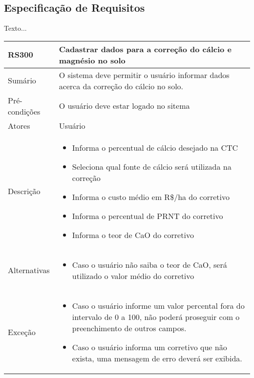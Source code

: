 \subsection{Especificação de Requisitos}
\label{sec:titSecEspReq}

Texto...

\begin{quadro}[H]
    \begin{tabular}{|p{3cm}|p{11cm}|}
        \hline
        \textbf{RS300} & \textbf{Cadastrar dados para a correção do cálcio e magnésio no solo}                  \\
        \hline
        Sumário        & O sistema deve permitir o usuário informar dados acerca da correção do cálcio no solo. \\
        \hline
        Pré-condições  & O usuário deve estar logado no sitema                                                  \\
        \hline
        Atores         & Usuário                                                                                \\
        \hline
        Descrição      &
        \begin{itemize}
            \item Informa o percentual de cálcio desejado na CTC
            \item Seleciona qual fonte de cálcio será utilizada na correção
            \item Informa o custo médio em R\$/ha do corretivo
            \item Informa o percentual de PRNT do corretivo
            \item Informa o teor de CaO do corretivo
        \end{itemize}                                                                               \\
        \hline
        Alternativas   &
        \begin{itemize}
            \item Caso o usuário não saiba o teor de CaO, será utilizado o valor médio do corretivo
        \end{itemize}                                                                               \\
        \hline
        Exceção        &
        \begin{itemize}
            \item Caso o usuário informe um valor percental fora do intervalo de 0 a 100, não poderá proseguir com o preenchimento de outros campos.
            \item Caso o usuário informa um corretivo que não exista, uma mensagem de erro deverá ser exibida.
        \end{itemize}                                                                               \\
        \hline
    \end{tabular}
\end{quadro}

